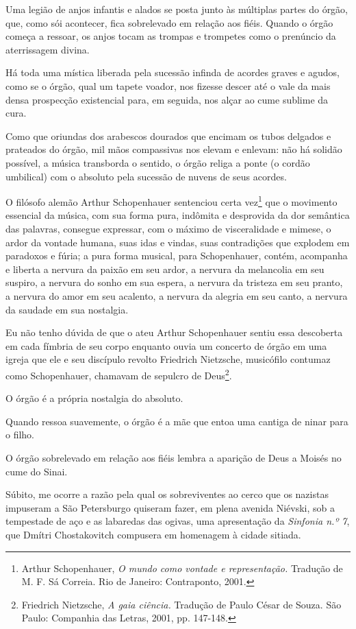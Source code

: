 Uma legião de anjos infantis e alados se posta junto às múltiplas partes
do órgão, que, como sói acontecer, fica sobrelevado em relação aos
fiéis. Quando o órgão começa a ressoar, os anjos tocam as trompas e
trompetes como o prenúncio da aterrissagem divina.

Há toda uma mística liberada pela sucessão infinda de acordes graves e
agudos, como se o órgão, qual um tapete voador, nos fizesse descer até o
vale da mais densa prospecção existencial para, em seguida, nos alçar ao
cume sublime da cura.

Como que oriundas dos arabescos dourados que encimam os tubos delgados e
prateados do órgão, mil mãos compassivas nos elevam e enlevam: não há
solidão possível, a música transborda o sentido, o órgão religa a ponte
(o cordão umbilical) com o absoluto pela sucessão de nuvens de seus
acordes.

O filósofo alemão Arthur Schopenhauer sentenciou certa vez\footnote{Arthur
  Schopenhauer, \emph{O mundo como vontade e representação.} Tradução de
  M. F. Sá Correia. Rio de Janeiro: Contraponto, 2001.} que o movimento
essencial da música, com sua forma pura, indômita e desprovida da dor
semântica das palavras, consegue expressar, com o máximo de
visceralidade e mimese, o ardor da vontade humana, suas idas e vindas,
suas contradições que explodem em paradoxos e fúria; a pura forma
musical, para Schopenhauer, contém, acompanha e liberta a nervura da
paixão em seu ardor, a nervura da melancolia em seu suspiro, a nervura
do sonho em sua espera, a nervura da tristeza em seu pranto, a nervura
do amor em seu acalento, a nervura da alegria em seu canto, a nervura da
saudade em sua nostalgia.

Eu não tenho dúvida de que o ateu Arthur Schopenhauer sentiu essa
descoberta em cada fímbria de seu corpo enquanto ouvia um concerto de
órgão em uma igreja que ele e seu discípulo revolto Friedrich Nietzsche,
musicófilo contumaz como Schopenhauer, chamavam de sepulcro de
Deus\footnote{Friedrich Nietzsche, \emph{A gaia ciência.} Tradução de
  Paulo César de Souza. São Paulo: Companhia das Letras, 2001, pp.
  147-148.}.

O órgão é a própria nostalgia do absoluto.

Quando ressoa suavemente, o órgão é a mãe que entoa uma cantiga de ninar
para o filho.

O órgão sobrelevado em relação aos fiéis lembra a aparição de Deus a
Moisés no cume do Sinai.

Súbito, me ocorre a razão pela qual os sobreviventes ao cerco que os
nazistas impuseram a São Petersburgo quiseram fazer, em plena avenida
Niévski, sob a tempestade de aço e as labaredas das ogivas, uma
apresentação da \emph{Sinfonia n.º 7}, que Dmítri Chostakovitch
compusera em homenagem à cidade sitiada.

